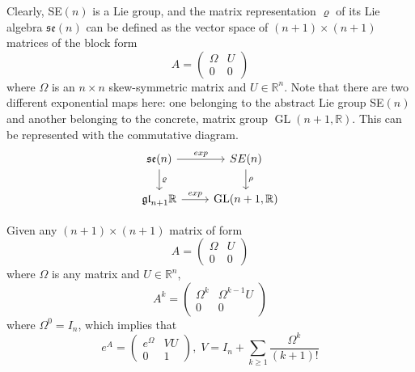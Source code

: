 \documentclass{article}
\DeclareMathOperator{\GL}{GL}
\begin{document}
      Clearly, SE$(n)$ is a Lie group, and the matrix representation $\varrho$ of its Lie algebra $\mathfrak{se}(n)$ can be defined as the vector space of $(n+1) \times (n+1)$ matrices of the block form 
      \begin{equation}
        A = \begin{pmatrix}
        \Omega & U \\0 & 0
        \end{pmatrix}
      \end{equation}
      where $\Omega$ is an $n \times n$ skew-symmetric matrix and $U \in \mathbb{R}^n$. Note that there are two different exponential maps here: one belonging to the abstract Lie group SE$(n)$ and another belonging to the concrete, matrix group $\GL(n+1, \mathbb{R})$. This can be represented with the commutative diagram. 
      \[\begin{tikzcd}
      \mathfrak{se}(n) \arrow{r}{exp} \arrow{d}{\varrho} & SE(n) \arrow{d} {\rho}\\
      \mathfrak{gl}_{n+1} \mathbb{R} \arrow{r}{exp} & \GL(n+1, \mathbb{R})
      \end{tikzcd}\]

      \begin{lemma}
        Given any $(n+1) \times (n+1)$ matrix of form 
        \begin{equation}
          A = \begin{pmatrix}
           \Omega & U \\0&0
          \end{pmatrix}
        \end{equation}
        where $\Omega$ is any matrix and $U \in \mathbb{R}^n$, 
        \begin{equation}
          A^k = \begin{pmatrix}
          \Omega^k & \Omega^{k-1} U \\0&0
          \end{pmatrix}
        \end{equation}
        where $\Omega^0 = I_n$, which implies that
        \begin{equation}
          e^A = \begin{pmatrix}
          e^\Omega & V U \\ 0 & 1
          \end{pmatrix}, \; V = I_n + \sum_{k \geq 1} \frac{\Omega^k}{(k+1)!}
        \end{equation}
      \end{lemma}
\end{document}
